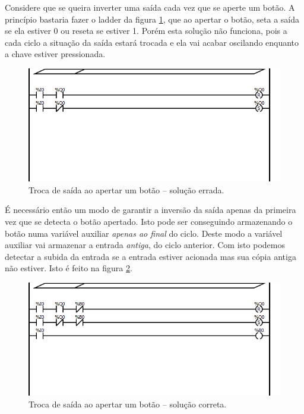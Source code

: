 Considere que se queira inverter uma saída cada vez que se aperte um botão. A princípio bastaria fazer o ladder da figura \ref{fig:ladder_pulsoRuim}, que ao apertar o botão, seta a saída se ela estiver 0 ou reseta se estiver 1. Porém esta solução não funciona, pois a cada ciclo a situação da saída estará trocada e ela vai acabar oscilando enquanto a chave estiver pressionada.

\begin{figure}[hbt]
	\centering
	\includegraphics[width=\textwidth]{figuras/pulsoRuim}
	\caption{Troca de saída ao apertar um botão -- solução errada.}
	\label{fig:ladder_pulsoRuim}
\end{figure}

É necessário então um modo de garantir a inversão da saída apenas da primeira vez que se detecta o botão apertado. Isto pode ser conseguindo armazenando o botão numa variável auxiliar \emph{apenas ao final} do ciclo. Deste modo a variável auxiliar vai armazenar a entrada \emph{antiga}, do ciclo anterior. Com isto podemos detectar a subida da entrada se a entrada estiver acionada mas sua cópia antiga não estiver. Isto é feito na figura \ref{fig:ladder_pulso}.
\begin{figure}[hbt]
	\centering
	\includegraphics[width=\textwidth]{figuras/pulso}
	\caption{Troca de saída ao apertar um botão -- solução correta.}
	\label{fig:ladder_pulso}
\end{figure}


